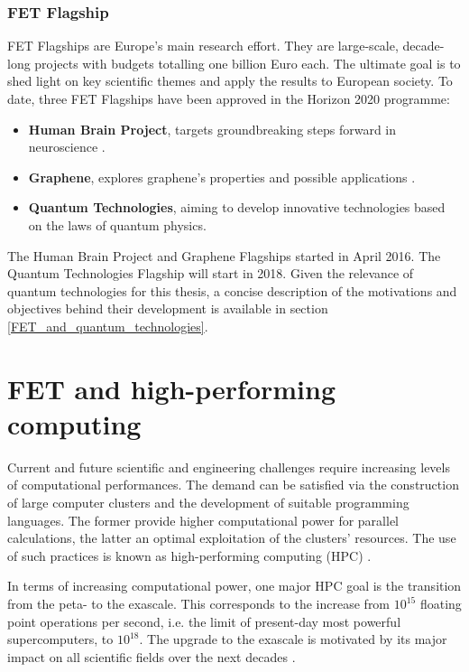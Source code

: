 \subsubsection{FET Flagship}
FET Flagships are Europe's main research effort. They are large-scale, decade-long projects with budgets totalling one billion Euro each. The ultimate goal is to shed light on key scientific themes and apply the results to European society. To date, three FET Flagships have been approved in the Horizon 2020 programme: 

\begin{itemize}
 \item \textbf{Human Brain Project}, targets groundbreaking steps forward in neuroscience \cite{HBP}.
 \item \textbf{Graphene}, explores graphene's properties and possible applications \cite{Graphene}.
 \item \textbf{Quantum Technologies}, aiming to develop innovative technologies based on the laws of quantum physics.
\end{itemize}
The Human Brain Project and Graphene Flagships started in April 2016. The Quantum Technologies Flagship will start in 2018. Given the relevance of quantum technologies for this thesis, a concise description of the motivations and objectives behind their development is available in section \ref{FET_and_quantum_technologies}.

\section{FET and high-performing computing} \label{FET_and_high-performing_computing}
Current and future scientific and engineering challenges require increasing levels of computational performances. The demand can be satisfied via the construction of large computer clusters and the development of suitable programming languages. The former provide higher computational power for parallel calculations, the latter an optimal exploitation of the clusters' resources. The use of such practices is known as high-performing computing (HPC) \cite{Hager}.

In terms of increasing computational power, one major HPC goal is the transition from the peta- to the exascale. This corresponds to the increase from $10^{15}$ floating point operations per second, i.e. the limit of present-day most powerful supercomputers, to $10^{18}$. The upgrade to the exascale is motivated by its major impact on all scientific fields over the next decades \cite{Vetter}. 

